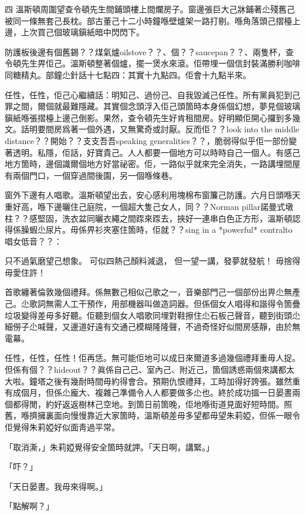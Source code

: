 四
溫斯頓周圍望查令頓先生間鋪頭樓上間爛房子。窗邊張巨大己牀鋪著尐殘舊己被同一條無套己長枕。部古董己十二小時鐘喺壁爐架一路打剔。喺角落頭己摺檯上邊，上次買己個玻璃鎭紙暗中閃閃下。

防護板後邊有個舊錫？？煤氣爐oilstove？？、個？？saucepan？？、兩隻杯，查令頓先生畀佢己。溫斯頓整著個爐，擺一煲水來滾。佢帶埋一個信封裝滿勝利咖啡同糖精丸。部鐘尐針話十七點四：其實十九點四。佢會十九點半來。

任性，任性，佢己心繼續話：明知己、過份己、自我毀滅己任性。所有黨員犯到己罪之間，爾個就最難隱藏。其實個念頭浮入佢己頭箇時本身係個幻想，夢見個玻璃鎭紙喺張摺檯上邊己倒影。果然，查令頓先生好肯租間房。好明顯佢開心攞到多幾文。話明要間房爲著一個外遇，又無驚奇或討厭。反而佢？？look into the middle distance？？開始？？支支吾吾speaking generalities？？，脆弱得似乎佢一部份變著透明。私隱，佢話，好寶貴己。人人都要一個地方可以時時自己一個人。有感己地方箇時，邊個識爾個地方好當祕密。佢，一路似乎就來完全消失，一路講埋間屋有兩個門口，一個穿過間後園，另一個喺條巷。

窗外下邊有人唱歌。溫斯頓望出去，安心感利用塊棉布窗簾己防護。六月日頭喺天重好高，喺下邊曬住己庭院，一個超大隻己女人，同？？Norman pillar諾曼式墩柱？？感堅固，洗衣盆同曬衣繩之間𨂽來𨂽去，挾好一連串白色正方形，溫斯頓認得係臊蝦尐尿片。毋係畀衫夾塞住箇時，佢就？？sing in a *powerful* contralto唱女低音？？：

	只不過氣磨望己想𧰼。
	可似四熱己顏料減退，
	但一望一講，發夢就發航！
	毋捨得毋愛住許！

首歌纏著倫敦幾個禮拜。係無數己相似己歌之一，音樂部門己一個部份出畀尐無產己。尐歌詞無需人工干預作，用部機器叫做造詞器。但係個女人唱得和諧得令箇疊垃圾變得差毋多好聽。佢聽到個女人唱歌同埋對鞋擦住尐石板己聲音，聽到街頭尐細僗子尐喊聲，又邊道好遠有交通己模糊隆隆聲，不過奇怪好似間房感靜，由於無電幕。

任性，任性，任性！佢再恁。無可能佢地可以成日來爾道多過幾個禮拜重毋人捉。但係有個？？hideout？？眞係自己己、室內己、附近己，箇個誘惑兩個來講都太大啦。鐘塔之後有幾耐時間毋約得會合。預期仇恨禮拜，工時加得好誇張。雖然重有成個月，但係尐龐大、複雜己準備令人人都要做多尐也。終於成功搵一日晏晝兩個都得閒，約好返返樹林己空地。到箇日前箇晚，佢地喺街道見面好短時間。照舊，喺擠擁裏面向慢慢靠近大家箇時，溫斯頓差毋多望都毋望朱莉婭，但係一眼令佢覺得朱莉婭好似面靑過平常。

「取消澌，」朱莉婭覺得安全箇時就䛅。「天日啊，講緊。」

「吓？」

「天日晏晝。我毋來得啊。」

「點解啊？」

